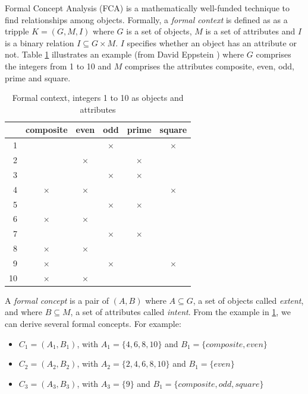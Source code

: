 \documentclass[11pt]{report}
\begin{document}
Formal Concept Analysis (FCA) \cite{Ganter2012} is a mathematically well-funded technique to find relationships among objects. Formally, a \textit{formal context} is defined as as a tripple $K = (G, M, I)$ where $G$ is a set of objects, $M$ is a set of attributes and $I$ is a binary relation $I \subseteq G \times M$. $I$ specifies whether an object has an attribute or not. Table \ref{table:example} illustrates an example (from David Eppstein \cite{fcaexample}) where $G$ comprises the integers from 1 to 10 and $M$ comprises the attributes composite, even, odd, prime and square.


\begin{table}[h]
\caption{Formal context, integers 1 to 10 as objects and attributes}
\label{table:example}
\centering

\def\arraystretch{1.2}%
\begin{tabular}{ r c c c c c}
\hline
  & composite & even & odd & prime & square\\
\hline

1 & & & $\times$ & &$\times$\\ 
2 & & $\times$ & & $\times$ &\\
3 & & & $\times$ & $\times$ &\\ 
4 & $\times$ & $\times$ & & & $\times$\\
5 & & & $\times$ & $\times$ &\\
6 & $\times$ & $\times$ & & &\\
7 & & & $\times$ & $\times$ &\\ 
8 & $\times$ & $\times$ & & &\\
9 & $\times$ & & $\times$ & & $\times$\\
10 & $\times$ & $\times$ & & &\\ \hline


\end{tabular}
\end{table}

A \textit{formal concept} is a pair of $(A, B)$ where $A \subseteq G$, a set of objects called \textit{extent}, and where $B \subseteq M$, a set of attributes called \textit{intent}. From the example in \ref{table:example}, we can derive several formal concepts. For example:
	\begin{itemize}
		\item $C_1 = (A_1, B_1)$,  with $A_1 = \{4,6,8,10\}$ and $B_1 = \{composite, even\}$
		\item $C_2 = (A_2, B_2)$,  with $A_2 = \{2,4,6,8,10\}$ and $B_1 = \{even\}$
		\item $C_3 = (A_3, B_3)$,  with $A_3 = \{9\}$ and $B_1 = \{composite, odd, square\}$
	\end{itemize}
\end{document}
